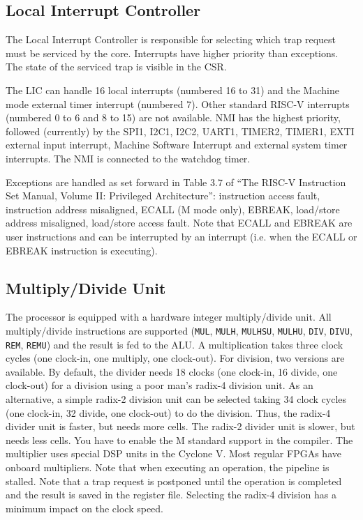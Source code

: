\documentclass[12pt]{article}
\begin{document}
\subsection{Local Interrupt Controller}
The Local Interrupt Controller is responsible for selecting which trap request must be serviced by the core. Interrupts have higher priority than exceptions. The state of the serviced trap is visible in the CSR.

The LIC can handle 16 local interrupts (numbered 16 to 31) and the Machine mode external timer interrupt (numbered 7). Other standard RISC-V interrupts (numbered 0 to 6 and 8 to 15) are not available. NMI has the highest priority, followed (currently) by the SPI1, I2C1, I2C2, UART1, TIMER2, TIMER1, EXTI external input interrupt, Machine Software Interrupt and external system timer interrupts. The NMI is connected to the watchdog timer.

Exceptions are handled as set forward in Table 3.7 of ``The RISC-V Instruction Set Manual, Volume II: Privileged Architecture'': instruction access fault, instruction address misaligned, ECALL (M mode only), EBREAK, load/store address misaligned, load/store access fault. Note that ECALL and EBREAK are user instructions and can be interrupted by an interrupt (i.e. when the ECALL or EBREAK instruction is executing).


\subsection{Multiply/Divide Unit}
The processor is equipped with a hardware integer multiply/divide unit. All multiply/divide instructions are supported (\lstinline|MUL|, \lstinline|MULH|, \lstinline|MULHSU|, \lstinline|MULHU|, \lstinline|DIV|, \lstinline|DIVU|, \lstinline|REM|, \lstinline|REMU|) and the result is fed to the ALU. A multiplication takes three clock cycles (one clock-in, one multiply, one clock-out). For division, two versions are available. By default, the divider needs 18 clocks (one clock-in, 16 divide, one clock-out) for a division using a poor man's radix-4 division unit. As an alternative, a simple radix-2 division unit can be selected taking 34 clock cycles (one clock-in, 32 divide, one clock-out) to do the division.  Thus, the radix-4 divider unit is faster, but needs more cells. The radix-2 divider unit is slower, but needs less cells. You have to enable the M standard support in the compiler. The multiplier uses special DSP units in the Cyclone V. Most regular FPGAs have onboard multipliers. Note that when executing an operation, the pipeline is stalled. Note that a trap request is postponed until the operation is completed and the result is saved in the register file. Selecting the radix-4 division has a minimum impact on the clock speed.
\end{document}
